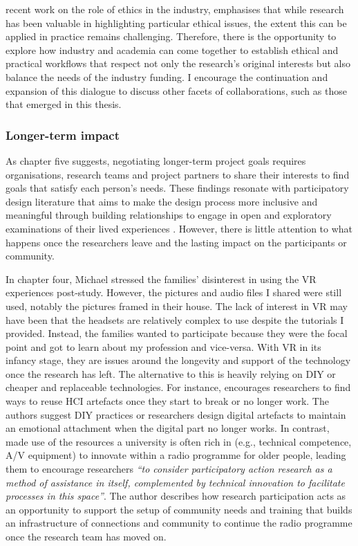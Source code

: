 \citeauthor{longo2020value} recent work on the role of ethics in the industry, emphasises that while research has been valuable in highlighting particular ethical issues, the extent this can be applied in practice remains challenging. Therefore, there is the opportunity to explore how industry and academia can come together to establish ethical and practical workflows that respect not only the research's original interests but also balance the needs of the industry funding. I encourage the continuation and expansion of this dialogue to discuss other facets of collaborations, such as those that emerged in this thesis.

\subsubsection{Longer-term impact}
\label{LongTermImpact}
As chapter five suggests, negotiating longer-term project goals requires organisations, research teams and project partners to share their interests to find goals that satisfy each person's needs. These findings resonate with participatory design literature that aims to make the design process more inclusive and meaningful through building relationships to engage in open and exploratory examinations of their lived experiences \citep{bannon2018introduction,hendriks_challenges_2014}. However, there is little attention to what happens once the researchers leave and the lasting impact on the participants or community. 

In chapter four, Michael stressed the families' disinterest in using the VR experiences post-study. However, the pictures and audio files I shared were still used, notably the pictures framed in their house. The lack of interest in VR may have been that the headsets are relatively complex to use despite the tutorials I provided. Instead, the families wanted to participate because they were the focal point and got to learn about my profession and vice-versa. With VR in its infancy stage, they are issues around the longevity and support of the technology once the research has left. The alternative to this is heavily relying on DIY or cheaper and replaceable technologies. For instance, \cite{arakelyan2013facilitation} encourages researchers to find ways to reuse HCI artefacts once they start to break or no longer work. The authors suggest DIY practices or researchers design digital artefacts to maintain an emotional attachment when the digital part no longer works. In contrast, \cite{reuter2021content} made use of the resources a university is often rich in (e.g., technical competence, A/V equipment) to innovate within a radio programme for older people, leading them to encourage researchers \textit{``to consider participatory action research as a method of assistance in itself, complemented by technical innovation to facilitate processes in this space''}. The author describes how research participation acts as an opportunity to support the setup of community needs and training that builds an infrastructure of connections and community to continue the radio programme once the research team has moved on.

